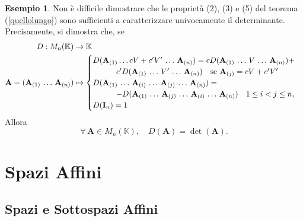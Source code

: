 \documentclass{article}
\theoremstyle{plain}
\theoremstyle{definition}
\newtheorem{exmp}{Esempio}[section]
\theoremstyle{remark}
\begin{document}
\vspace{10pt}

\begin{exmp}
    Non è difficile dimostrare che le proprietà (2), (3) e (5) del teorema (\ref{quellolungo}) sono sufficienti a caratterizzare univocamente il determinante. Precisamente, si dimostra che, se 
    \begin{align*}
        D:M_n(\mathbb{K})&\to\mathbb{K}\\
        \mathbf{A}=(\mathbf{A}_{(1)}\,\ldots\,\mathbf{A}_{(n)})&\mapsto\begin{cases}
            D(\mathbf{A}_{(1)}\ldots cV+c'V'\,\ldots\,\mathbf{A}_{(n)})=cD(\mathbf{A}_{(1)}\,\ldots\,V\,\ldots\,\mathbf{A}_{(n)})+\\
            \quad\quad\quad c'D(\mathbf{A}_{(1)}\,\ldots\,V'\,\ldots\,\mathbf{A}_{(n)})\quad \textup{se }\mathbf{A}_{(j)}=cV+c'V'\\
            D(\mathbf{A}_{(1)}\,\ldots\,\mathbf{A}_{(i)}\,\ldots\,\mathbf{A}_{(j)}\,\ldots\,\mathbf{A}_{(n)})=\\
            \quad\quad\quad -D(\mathbf{A}_{(1)}\,\ldots\,\mathbf{A}_{(j)}\,\ldots\,\mathbf{A}_{(i)}\,\ldots\,\mathbf{A}_{(n)})\quad 1\leq i<j\leq n,\\
            D(\mathbf{I}_n)=1\\         
        \end{cases}
    \end{align*}
    Allora \[\forall\,\mathbf{A}\in M_n(\mathbb{K}),\quad D(\mathbf{A})=\det(\mathbf{A}).\]
\end{exmp}

\vspace{50pt}
\section{Spazi Affini}
\vspace{20pt}

\vspace{20pt}
\subsection{Spazi e Sottospazi Affini}
\vspace{20pt}
\end{document}
